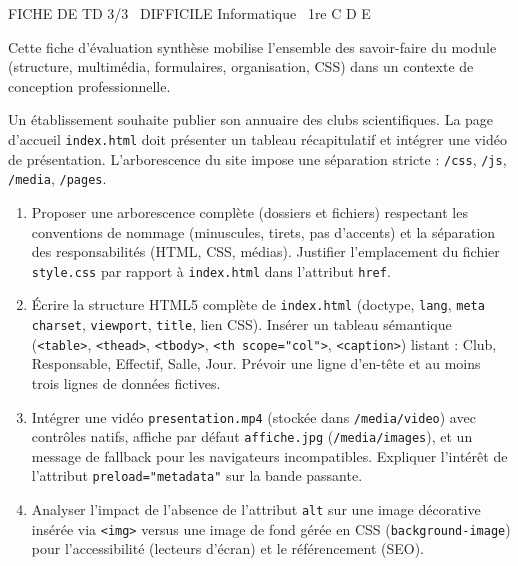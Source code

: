 \documentclass[11pt]{article}
\begin{document}
\begin{tcolorbox}[enhanced,colback=popink,colframe=popink,arc=10pt,boxrule=0pt,left=12pt,right=12pt,top=9pt,bottom=9pt]
{\color{white}\popxbold\small FICHE DE TD 3/3 \textbullet\ DIFFICILE \hfill Informatique \textbullet\ 1re C D E\par}
\end{tcolorbox}
\vspace{4pt}
Cette fiche d'évaluation synthèse mobilise l'ensemble des savoir-faire du module (structure, multimédia, formulaires, organisation, CSS) dans un contexte de conception professionnelle.

\begin{exercice}
Un établissement souhaite publier son annuaire des clubs scientifiques. La page d'accueil \texttt{index.html} doit présenter un tableau récapitulatif et intégrer une vidéo de présentation. L'arborescence du site impose une séparation stricte : \texttt{/css}, \texttt{/js}, \texttt{/media}, \texttt{/pages}.

\begin{enumerate}
    \item Proposer une arborescence complète (dossiers et fichiers) respectant les conventions de nommage (minuscules, tirets, pas d'accents) et la séparation des responsabilités (HTML, CSS, médias). Justifier l'emplacement du fichier \texttt{style.css} par rapport à \texttt{index.html} dans l'attribut \texttt{href}.
    \item Écrire la structure HTML5 complète de \texttt{index.html} (doctype, \texttt{lang}, \texttt{meta charset}, \texttt{viewport}, \texttt{title}, lien CSS). Insérer un tableau sémantique (\texttt{<table>}, \texttt{<thead>}, \texttt{<tbody>}, \texttt{<th scope="col">}, \texttt{<caption>}) listant : Club, Responsable, Effectif, Salle, Jour. Prévoir une ligne d'en-tête et au moins trois lignes de données fictives.
    \item Intégrer une vidéo \texttt{presentation.mp4} (stockée dans \texttt{/media/video}) avec contrôles natifs, affiche par défaut \texttt{affiche.jpg} (\texttt{/media/images}), et un message de fallback pour les navigateurs incompatibles. Expliquer l'intérêt de l'attribut \texttt{preload="metadata"} sur la bande passante.
    \item Analyser l'impact de l'absence de l'attribut \texttt{alt} sur une image décorative insérée via \texttt{<img>} versus une image de fond gérée en CSS (\texttt{background-image}) pour l'accessibilité (lecteurs d'écran) et le référencement (SEO).
\end{enumerate}
\end{exercice}
\end{document}
